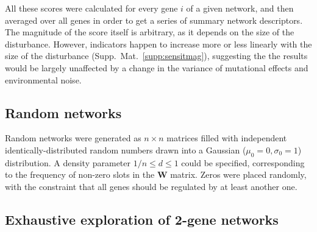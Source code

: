\documentclass[10pt,a4paper]{article}
\begin{document}
All these scores were calculated for every gene $i$ of a given network, and then averaged over all genes in order to get a series of summary network descriptors. The magnitude of the score itself is arbitrary, as it depends on the size of the disturbance. However, indicators happen to increase more or less linearly with the size of the disturbance (Supp.\ Mat.\ \ref{supp:sensitmag}), suggesting the the results would be largely unaffected by a change in the variance of mutational effects and environmental noise. 

\subsection{Random networks}

Random networks were generated as $n\times n$ matrices filled with independent identically-distributed random numbers drawn into a Gaussian ($\mu_0 = 0, \sigma_0 = 1$) distribution.  A density parameter $1/n \leq d \leq 1$ could be specified, corresponding to the frequency of non-zero slots in the $\bm W$ matrix. Zeros were placed randomly, with the constraint that all genes should be regulated by at least another one. 

\subsection{Exhaustive exploration of 2-gene networks}
\end{document}
